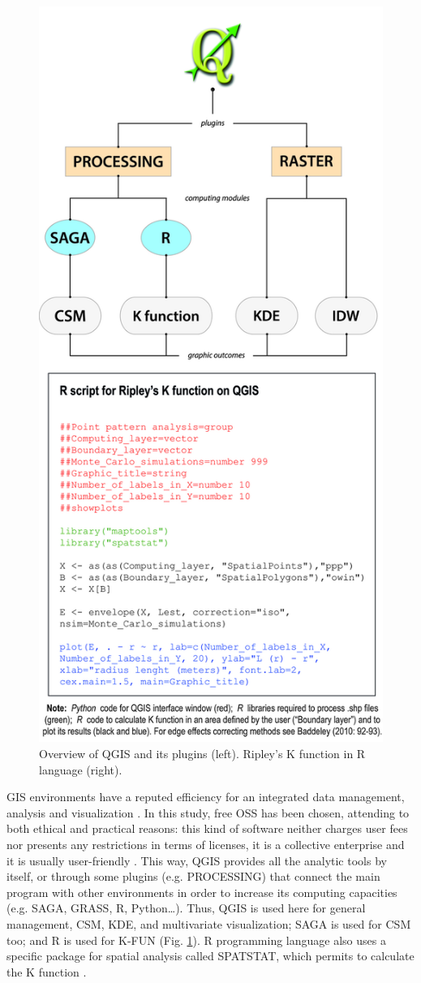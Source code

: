 \begin{figure}[!htb]
	\includegraphics[width=.7\linewidth]{figures/garcia_Fig2}
	\centering
	\caption{Overview of QGIS and its plugins (left). Ripley’s K function in R language (right).}
	\label{fig:Garcia_Fig2}
\end{figure}
GIS environments have a reputed efficiency for an integrated data management, analysis and visualization \parencites{Conolly_2006}{Wheatley_2002}. In this study, free OSS has been chosen, attending to both ethical and practical reasons: this kind of software neither charges user fees nor presents any restrictions in terms of licenses, it is a collective enterprise and it is usually user-friendly \parencite{Orengo_2015}. This way, QGIS provides all the analytic tools by itself, or through some plugins (e.g. PROCESSING) that connect the main program with other environments in order to increase its computing capacities (e.g. SAGA, GRASS, R, Python…). Thus, QGIS is used here for general management, CSM, KDE, and multivariate visualization; SAGA is used for CSM too; and R is used for K-FUN (Fig. \ref{fig:Garcia_Fig2}). R programming language also uses a specific package for spatial analysis called SPATSTAT, which permits to calculate the K function \parencites[see][]{Baddeley_2010}{Baddeley_2005}.


